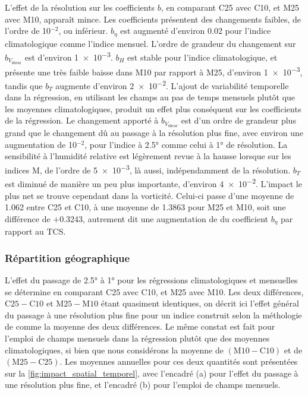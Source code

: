 \documentclass[../main.tex]{subfiles}
\begin{document}
L'effet de la résolution sur les coefficients $b$, en comparant C25 avec C10, et M25 avec M10, apparaît mince. Les coefficients présentent des changements
faibles, de l'ordre de \num{10}$^{\num{-2}}$, ou inférieur. $b_{\eta}$ est augmenté d'environ \num{0.02} pour l'indice climatologique comme l'indice mensuel.
L'ordre de grandeur du changement sur $b_{V_{\mathrm{shear}}}$ est d'environ \num{1e-3}. $b_H$ est stable pour l'indice climatologique, et présente une très
faible baisse dans M10 par rapport à M25, d'environ \num{1e-3}, tandis que $b_T$ augmente d'environ \num{2e-2}. L'ajout de variabilité temporelle dans la
régression, en utilisant les champs au pas de temps mensuels plutôt que les moyennes climatologiques, produit un effet plus conséquent sur les coefficients de
la régression. Le changement apporté à $b_{V_{\mathrm{shear}}}$ est d'un ordre de grandeur plus grand que le changement dû au passage à la résolution plus fine,
avec environ une augmentation de \num{10}$^{\num{-2}}$, pour l'indice à \ang{2.5} comme celui à \ang{1} de résolution. La sensibilité à l'humidité relative est
légèrement revue à la hausse lorsque sur les indices M, de l'ordre de \num{5e-3}, là aussi, indépendamment de la résolution. $b_T$ est diminué de manière un peu
plus importante, d'environ \num{4e-2}. L'impact le plus net se trouve cependant dans la vorticité. Celui-ci passe d'une moyenne de \num{1.062} entre C25 et C10,
à une moyenne de \num{1.3863} pour M25 et M10, soit une différence de $+$\num{0.3243}, autrement dit une augmentation de  du coefficient $b_{\eta}$
par rapport au TCS.

\subsubsection{Répartition géographique}\label{sec:repartition_geographique}

L'effet du passage de \ang{2.5} à \ang{1} pour les régressions climatologiques et mensuelles se détermine en comparant C25 avec C10, et M25 avec M10. Les deux
différences, $\mathrm{C25} - \mathrm{C10}$ et $\mathrm{M25} - \mathrm{M10}$ étant quasiment identiques, on décrit ici l'effet général du passage à une
résolution plus fine pour un indice construit selon la méthologie de \textcite{tippett_poisson_2011} comme la moyenne des deux différences. Le même constat est
fait pour l'emploi de champs mensuels dans la régression plutôt que des moyennes climatologiques, si bien que nous considérons la moyenne de $(\mathrm{M10} -
\mathrm{C10})$ et de $(\mathrm{M25} - \mathrm{C25})$. Les moyennes annuelles pour ces deux quantités sont présentées sur la \cref{fig:impact_spatial_temporel},
avec l'encadré (a) pour l'effet du passage à une résolution plus fine, et l'encadré (b) pour l'emploi de champs mensuels.
\end{document}
